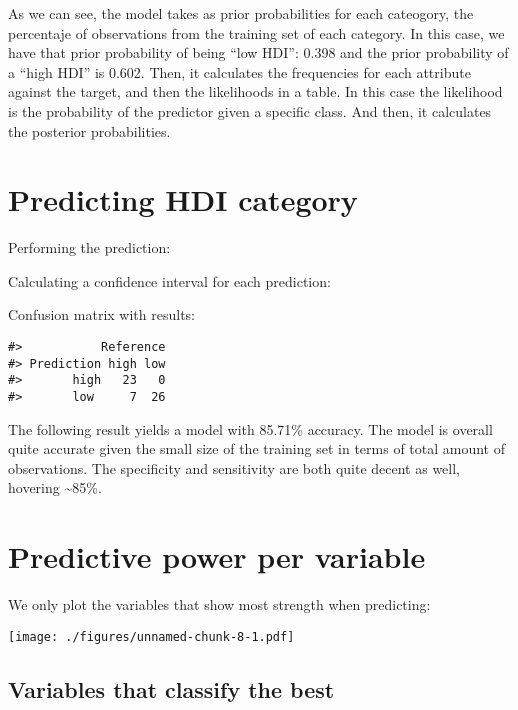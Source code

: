 \documentclass[]{article}
\begin{document}
As we can see, the model takes as prior probabilities for each
cateogory, the percentaje of observations from the training set of each
category. In this case, we have that prior probability of being ``low
HDI'': 0.398 and the prior probability of a ``high HDI'' is 0.602. Then,
it calculates the frequencies for each attribute against the target, and
then the likelihoods in a table. In this case the likelihood is the
probability of the predictor given a specific class. And then, it
calculates the posterior probabilities.

\hypertarget{predicting-hdi-category}{%
\section{Predicting HDI category}\label{predicting-hdi-category}}

Performing the prediction:

Calculating a confidence interval for each prediction:

Confusion matrix with results:

\tiny

\begin{verbatim}
#>           Reference
#> Prediction high low
#>       high   23   0
#>       low     7  26
\end{verbatim}

\normalsize

The following result yields a model with 85.71\% accuracy. The model is
overall quite accurate given the small size of the training set in terms
of total amount of observations. The specificity and sensitivity are
both quite decent as well, hovering \textasciitilde{}85\%.

\newpage

\hypertarget{predictive-power-per-variable}{%
\section{Predictive power per
variable}\label{predictive-power-per-variable}}

We only plot the variables that show most strength when predicting:

\texttt{[image: ./figures/unnamed-chunk-8-1.pdf]}

\hypertarget{variables-that-classify-the-best}{%
\subsection{Variables that classify the
best}\label{variables-that-classify-the-best}}
\end{document}
